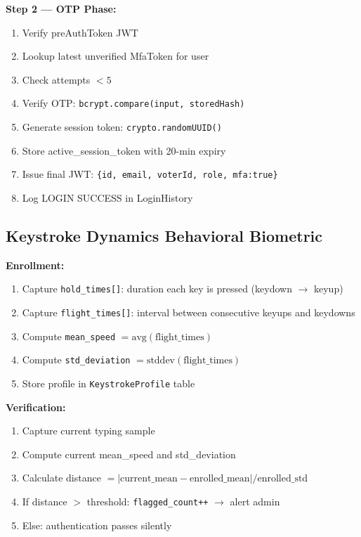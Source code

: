 \documentclass[oneside,a4paper,12pt]{book}
\begin{document}
\textbf{Step 2 --- OTP Phase:}
\begin{enumerate}[leftmargin=1.5cm]
    \item Verify preAuthToken JWT
    \item Lookup latest unverified MfaToken for user
    \item Check attempts $< 5$
    \item Verify OTP: \texttt{bcrypt.compare(input, storedHash)}
    \item Generate session token: \texttt{crypto.randomUUID()}
    \item Store active\_session\_token with 20-min expiry
    \item Issue final JWT: \texttt{\{id, email, voterId, role, mfa:true\}}
    \item Log LOGIN SUCCESS in LoginHistory
\end{enumerate}

\subsection{Keystroke Dynamics Behavioral Biometric}

\textbf{Enrollment:}
\begin{enumerate}[leftmargin=1.5cm]
    \item Capture \texttt{hold\_times[]}: duration each key is pressed (keydown $\rightarrow$ keyup)
    \item Capture \texttt{flight\_times[]}: interval between consecutive keyups and keydowns
    \item Compute \texttt{mean\_speed} $= \text{avg}(\text{flight\_times})$
    \item Compute \texttt{std\_deviation} $= \text{stddev}(\text{flight\_times})$
    \item Store profile in \texttt{KeystrokeProfile} table
\end{enumerate}

\textbf{Verification:}
\begin{enumerate}[leftmargin=1.5cm]
    \item Capture current typing sample
    \item Compute current mean\_speed and std\_deviation
    \item Calculate distance $= |\text{current\_mean} - \text{enrolled\_mean}| / \text{enrolled\_std}$
    \item If distance $>$ threshold: \texttt{flagged\_count++} $\rightarrow$ alert admin
    \item Else: authentication passes silently
\end{enumerate}
\end{document}

